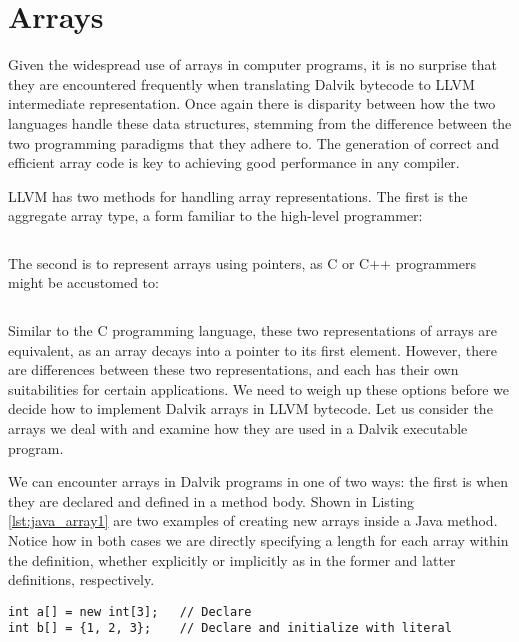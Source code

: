 \section{Arrays}
\label{sec:arrays}

Given the widespread use of arrays in computer programs, it is no surprise that they are encountered frequently when translating Dalvik bytecode to LLVM intermediate representation. Once again there is disparity between how the two languages handle these data structures, stemming from the difference between the two programming paradigms that they adhere to. The generation of correct and efficient array code is key to achieving good performance in any compiler.

LLVM has two methods for handling array representations. The first is the aggregate array type, a form familiar to the high-level programmer:

\lstset{
	language=Assembly,
	basicstyle=\small,
	stringstyle=\ttfamily
}
\begin{lstlisting}[frame=single]
%array = [<# elements> x <element type>]
\end{lstlisting}

The second is to represent arrays using pointers, as C or C++ programmers might be accustomed to:

\begin{lstlisting}[frame=single]
%array = <element type>*
\end{lstlisting}

Similar to the C programming language, these two representations of arrays are equivalent, as an array decays into a pointer to its first element. However, there are differences between these two representations, and each has their own suitabilities for certain applications. We need to weigh up these options before we decide how to implement Dalvik arrays in LLVM bytecode. Let us consider the arrays we deal with and examine how they are used in a Dalvik executable program.

We can encounter arrays in Dalvik programs in one of two ways: the first is when they are declared and defined in a method body. Shown in Listing \ref{lst:java_array1} are two examples of creating new arrays inside a Java method. Notice how in both cases we are directly specifying a length for each array within the definition, whether explicitly or implicitly as in the former and latter definitions, respectively.

\lstset{
	language=Java,
	basicstyle=\small,
	stringstyle=\ttfamily
}
\begin{lstlisting}[frame=single, caption={Arrays in Java}, label={lst:java_array1}]
int a[] = new int[3];   // Declare
int b[] = {1, 2, 3};    // Declare and initialize with literal
\end{lstlisting}

